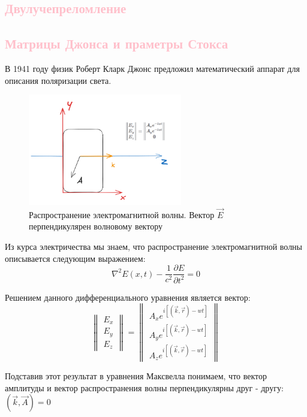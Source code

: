 \documentclass[14pt, singlecolumn, citestyle=authoryear]{elegantbook}
\begin{document}
\subsection*{\textcolor{pink}{Двулучепреломление}}
\subsection*{\textcolor{pink}{Матрицы Джонса и праметры Стокса}}
В 1941 году физик Роберт Кларк Джонс предложил математический аппарат для описания поляризации света. 

\begin{figure}[htbp]
  \centering
  \includegraphics[width=0.6\textwidth]{stokes_1.png}
  \caption{Распространение электромагнитной волны. Вектор $\vec{E}$ перпендикулярен волновому вектору}
  \label{fig:wave}
\end{figure}

Из курса электричества мы знаем, что распространение электромагнитной волны описывается следующим выражением:
$$
\nabla^{2} E(x, t) - \frac{1}{c^{2}} \frac{\partial E}{\partial t^{2}} = 0
\label{wave_equation}
$$

Решением данного дифференциального уравнения является вектор:
$$
\begin{Vmatrix}   
E_{x} \\
E_{y} \\
E_{z}

\end{Vmatrix}= 
\begin{Vmatrix}   
A_{x} e^{i[(\vec{k}, \vec{r}) - wt]} \\
A_{y} e^{i[(\vec{k}, \vec{r}) - wt]}\\
A_{z} e^{i[(\vec{k}, \vec{r}) - wt]}

\end{Vmatrix}
$$

Подставив этот результат в уравнения Максвелла понимаем, что вектор амплитуды и вектор распространения волны перпендикулярны друг - другу: $(\vec{k}, \vec{A}) = 0$
\end{document}
